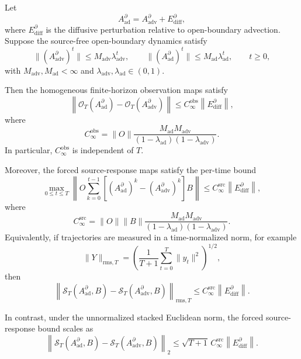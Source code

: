 \begin{lemma}
\label{lem:weak_observable_diffusion}
Let
\[
A_{\mathrm{ad}}^{\partial}
=
A_{\mathrm{adv}}^{\partial}
+
E_{\mathrm{diff}}^{\partial},
\]
where \(E_{\mathrm{diff}}^{\partial}\) is the diffusive perturbation
relative to open-boundary advection. Suppose the source-free
open-boundary dynamics satisfy
\[
\|(A_{\mathrm{adv}}^{\partial})^t\|
\le
M_{\mathrm{adv}}\lambda_{\mathrm{adv}}^t,
\qquad
\|(A_{\mathrm{ad}}^{\partial})^t\|
\le
M_{\mathrm{ad}}\lambda_{\mathrm{ad}}^t,
\qquad
t\ge 0,
\]
with \(M_{\mathrm{adv}},M_{\mathrm{ad}}<\infty\) and
\(\lambda_{\mathrm{adv}},\lambda_{\mathrm{ad}}\in(0,1)\).

Then the homogeneous finite-horizon observation maps satisfy
\begin{equation}
\left\|
\mathcal O_T(A_{\mathrm{ad}}^{\partial})
-
\mathcal O_T(A_{\mathrm{adv}}^{\partial})
\right\|
\le
C_{\infty}^{\mathrm{obs}}
\left\|
E_{\mathrm{diff}}^{\partial}
\right\|,
\label{eq:obs_uniform_bound}
\end{equation}
where
\begin{equation}
C_{\infty}^{\mathrm{obs}}
=
\|O\|
\frac{
M_{\mathrm{ad}}M_{\mathrm{adv}}
}{
(1-\lambda_{\mathrm{ad}})(1-\lambda_{\mathrm{adv}})
}.
\label{eq:Cinf_obs_def}
\end{equation}
In particular, \(C_{\infty}^{\mathrm{obs}}\) is independent of \(T\).

Moreover, the forced source-response maps satisfy the per-time bound
\begin{equation}
\max_{0\le t\le T}
\left\|
O\sum_{k=0}^{t-1}
\left[
(A_{\mathrm{ad}}^{\partial})^k
-
(A_{\mathrm{adv}}^{\partial})^k
\right]B
\right\|
\le
C_{\infty}^{\mathrm{src}}
\left\|
E_{\mathrm{diff}}^{\partial}
\right\|,
\label{eq:src_uniform_per_time_bound}
\end{equation}
where
\begin{equation}
C_{\infty}^{\mathrm{src}}
=
\|O\|\|B\|
\frac{
M_{\mathrm{ad}}M_{\mathrm{adv}}
}{
(1-\lambda_{\mathrm{ad}})(1-\lambda_{\mathrm{adv}})
}.
\label{eq:Cinf_src_def}
\end{equation}
Equivalently, if trajectories are measured in a time-normalized norm,
for example
\[
\|Y\|_{\mathrm{rms},T}
=
\left(
\frac{1}{T+1}
\sum_{t=0}^{T}
\|y_t\|^2
\right)^{1/2},
\]
then
\begin{equation}
\left\|
\mathcal S_T(A_{\mathrm{ad}}^{\partial},B)
-
\mathcal S_T(A_{\mathrm{adv}}^{\partial},B)
\right\|_{\mathrm{rms},T}
\le
C_{\infty}^{\mathrm{src}}
\left\|
E_{\mathrm{diff}}^{\partial}
\right\|.
\label{eq:src_uniform_rms_bound}
\end{equation}

In contrast, under the unnormalized stacked Euclidean norm, the forced
source-response bound scales as
\begin{equation}
\left\|
\mathcal S_T(A_{\mathrm{ad}}^{\partial},B)
-
\mathcal S_T(A_{\mathrm{adv}}^{\partial},B)
\right\|_{2}
\le
\sqrt{T+1}\,
C_{\infty}^{\mathrm{src}}
\left\|
E_{\mathrm{diff}}^{\partial}
\right\|.
\label{eq:src_stacked_l2_bound}
\end{equation}
\end{lemma}

